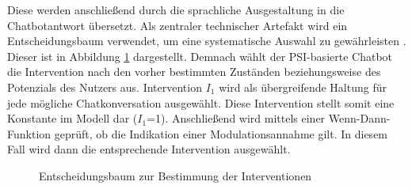 Diese werden anschließend durch die sprachliche Ausgestaltung in die Chatbotantwort übersetzt. Als zentraler technischer Artefakt wird ein Entscheidungsbaum verwendet, um eine systematische Auswahl zu gewährleisten \citep{baumel2025more}. Dieser ist in Abbildung \ref{fig:entscheidungsbaum_interventionsmenge} dargestellt. Demnach wählt der PSI-basierte Chatbot die Intervention nach den vorher bestimmten Zuständen beziehungsweise des Potenzials des Nutzers aus. Intervention $I_1$ wird als übergreifende Haltung für jede mögliche Chatkonversation ausgewählt. Diese Intervention stellt somit eine Konstante im Modell dar ($I_1$=1). Anschließend wird mittels einer Wenn-Dann-Funktion geprüft, ob die Indikation einer Modulationsannahme gilt. In diesem Fall wird dann die entsprechende Intervention ausgewählt. 


\begin{figure}[htbp]
    \centering
    \caption{Entscheidungsbaum zur Bestimmung der Interventionen}
    \label{fig:entscheidungsbaum_interventionsmenge}
\end{figure}



